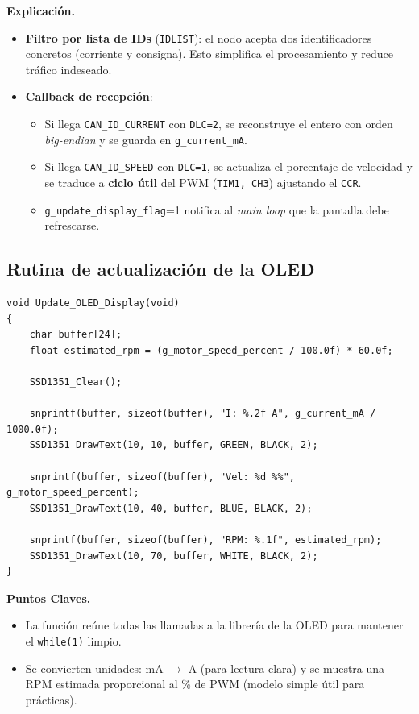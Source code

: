 \documentclass[a4paper,12pt]{article}
\begin{document}
\noindent\textbf{Explicación.}
\begin{itemize}
  \item \textbf{Filtro por lista de IDs} (\texttt{IDLIST}): el nodo acepta dos identificadores concretos (corriente y consigna). Esto simplifica el procesamiento y reduce tráfico indeseado.
  \item \textbf{Callback de recepción}:
    \begin{itemize}
      \item Si llega \texttt{CAN\_ID\_CURRENT} con \texttt{DLC=2}, se reconstruye el entero con orden \emph{big-endian} y se guarda en \texttt{g\_current\_mA}.
      \item Si llega \texttt{CAN\_ID\_SPEED} con \texttt{DLC=1}, se actualiza el porcentaje de velocidad y se traduce a \textbf{ciclo útil} del PWM (\texttt{TIM1, CH3}) ajustando el \texttt{CCR}.
      \item \texttt{g\_update\_display\_flag}=1 notifica al \textit{main loop} que la pantalla debe refrescarse.
    \end{itemize}
\end{itemize}

\subsection{Rutina de actualización de la OLED}
\begin{lstlisting}
void Update_OLED_Display(void)
{
    char buffer[24];
    float estimated_rpm = (g_motor_speed_percent / 100.0f) * 60.0f;

    SSD1351_Clear();

    snprintf(buffer, sizeof(buffer), "I: %.2f A", g_current_mA / 1000.0f);
    SSD1351_DrawText(10, 10, buffer, GREEN, BLACK, 2);

    snprintf(buffer, sizeof(buffer), "Vel: %d %%", g_motor_speed_percent);
    SSD1351_DrawText(10, 40, buffer, BLUE, BLACK, 2);

    snprintf(buffer, sizeof(buffer), "RPM: %.1f", estimated_rpm);
    SSD1351_DrawText(10, 70, buffer, WHITE, BLACK, 2);
}
\end{lstlisting}

\noindent\textbf{Puntos Claves.}
\begin{itemize}
  \item La función reúne todas las llamadas a la librería de la OLED para mantener el \texttt{while(1)} limpio.
  \item Se convierten unidades: mA $\rightarrow$ A (para lectura clara) y se muestra una RPM estimada proporcional al \% de PWM (modelo simple útil para prácticas).
\end{itemize}
\end{document}
